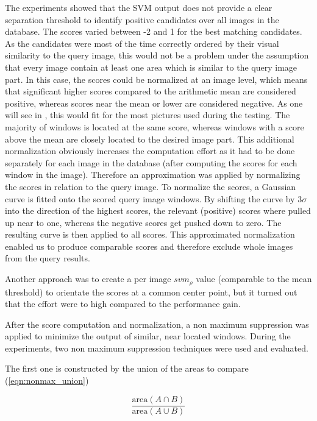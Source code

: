 The experiments showed that the \ac{SVM} output does not provide a clear separation threshold to identify positive candidates over all images in the database. The scores varied between -2 and 1 for the best matching candidates. As the candidates were most of the time correctly ordered by their visual similarity to the query image, this would not be a problem under the assumption that every image contain at least one area which is similar to the query image part. In this case, the scores could be normalized at an image level, which means that significant higher scores compared to the arithmetic mean are considered positive, whereas scores near the mean or lower are considered negative. %
As one will see in , this would fit for the most pictures used during the testing. The majority of windows is located at the same score, whereas windows with a score above the mean are closely located to the desired image part.
This additional normalization obviously increases the computation effort as it had to be done separately for each image in the database (after computing the scores for each window in the image). Therefore an approximation was applied by normalizing the scores in relation to the query image. To normalize the scores, a Gaussian curve is fitted onto the scored query image windows. By shifting the curve by $3\sigma$ into the direction of the highest scores, the relevant (positive) scores where pulled up near to one, whereas the negative scores get pushed down to zero. The resulting curve is then applied to all scores. This approximated normalization enabled us to produce comparable scores and therefore exclude whole images from the query results.

Another approach was to create a per image $svm_\rho$ value (comparable to the mean threshold) to orientate the scores at a common center point, but it turned out that the effort were to high compared to the performance gain.

After the score computation and normalization, a non maximum suppression was applied to minimize the output of similar, near located windows.
During the experiments, two non maximum suppression techniques were used and evaluated.

The first one is constructed by the union of the areas to compare (\ref{eqn:nonmax_union})

\begin{equation}
\frac{\text{area}(A \cap B)}{\text{area}(A \cup B)}
\label{eqn:nonmax_union}
\end{equation}


